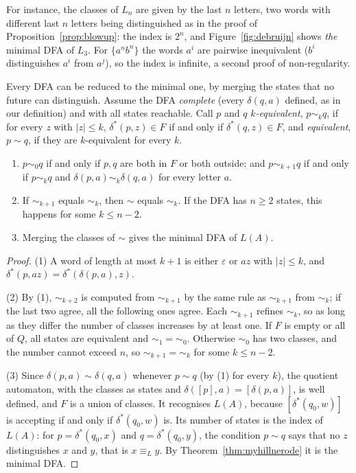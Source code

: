 For instance, the classes of $L_n$ are given by the last $n$ letters, two words with different last $n$ letters being distinguished as in the proof of Proposition~\ref{prop:blowup}: the index is $2^n$, and Figure~\ref{fig:debruijn} shows \emph{the} minimal DFA of $L_3$. For $\{a^nb^n\}$ the words $a^i$ are pairwise inequivalent ($b^i$ distinguishes $a^i$ from $a^j$), so the index is infinite, a second proof of non-regularity.

Every DFA can be reduced to the minimal one, by merging the states that no future can distinguish. Assume the DFA \emph{complete} (every $\delta(q,a)$ defined, as in our definition) and with all states reachable. Call $p$ and $q$ \emph{$k$-equivalent}, $p\sim_kq$, if for every $z$ with $|z|\le k$, $\delta^*(p,z)\in F$ if and only if $\delta^*(q,z)\in F$, and \emph{equivalent}, $p\sim q$, if they are $k$-equivalent for every $k$.

\begin{theorem}\label{thm:moore}
\begin{enumerate}
\item $p\sim_0q$ if and only if $p,q$ are both in $F$ or both outside; and $p\sim_{k+1}q$ if and only if $p\sim_kq$ and $\delta(p,a)\sim_k\delta(q,a)$ for every letter $a$.
\item If $\sim_{k+1}$ equals $\sim_k$, then $\sim$ equals $\sim_k$. If the DFA has $n\ge2$ states, this happens for some $k\le n-2$.
\item Merging the classes of $\sim$ gives the minimal DFA of $L(A)$.
\end{enumerate}
\end{theorem}

\begin{proof}
(1) A word of length at most $k+1$ is either $\varepsilon$ or $az$ with $|z|\le k$, and $\delta^*(p,az)=\delta^*(\delta(p,a),z)$.

(2) By (1), $\sim_{k+2}$ is computed from $\sim_{k+1}$ by the same rule as $\sim_{k+1}$ from $\sim_k$; if the last two agree, all the following ones agree. Each $\sim_{k+1}$ refines $\sim_k$, so as long as they differ the number of classes increases by at least one. If $F$ is empty or all of $Q$, all states are equivalent and $\sim_1=\sim_0$. Otherwise $\sim_0$ has two classes, and the number cannot exceed $n$, so $\sim_{k+1}=\sim_k$ for some $k\le n-2$.

(3) Since $\delta(p,a)\sim\delta(q,a)$ whenever $p\sim q$ (by (1) for every $k$), the quotient automaton, with the classes as states and $\delta([p],a)=[\delta(p,a)]$, is well defined, and $F$ is a union of classes. It recognises $L(A)$, because $[\delta^*(q_0,w)]$ is accepting if and only if $\delta^*(q_0,w)$ is. Its number of states is the index of $L(A)$: for $p=\delta^*(q_0,x)$ and $q=\delta^*(q_0,y)$, the condition $p\sim q$ says that no $z$ distinguishes $x$ and $y$, that is $x\equiv_Ly$. By Theorem~\ref{thm:myhillnerode} it is the minimal DFA.
\end{proof}

